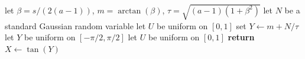\documentclass[12pt,reqno,tbtags]{amsart}
\newcommand{\inlaw}{\buildrel {\mathcal L} \over =}
\begin{document}
\begin{algorithm}[H]
\caption{PearsonIV generator for $a > 1$ by rejection from the normal density when $\tan (m) \le 3/(4 \pi) \approx 0.2387324$, or equivalently, when $m \le  \arctan(3/(4 \pi)) \approx 0.2344$.}\label{simplegaussian}
\begin{algorithmic}[1]
\State let $\beta = s/(2(a-1))$,  $m = \arctan(\beta)$, $\tau = \sqrt{(a-1)(1+\beta^2 )}$
\Repeat 
\State let $N$ be a standard Gaussian random variable 
\State let $U$ be uniform on $[0,1]$
\State set $Y \leftarrow  m + N/\tau$
\State
{}
\Else
\Repeat 
\State let $Y$ be uniform on $[-\pi/2, \pi/2]$ 
\State let $U$ be uniform on $[0,1]$
\EndIf
\State \textbf {return} $X \leftarrow \tan(Y)$  
\Comment{$X \inlaw P_{a,s}$ }
\end{algorithmic}
\end{algorithm}
\end{document}
